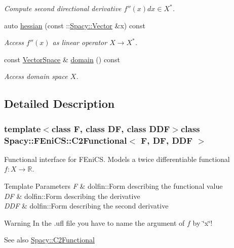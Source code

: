 \begin{DoxyCompactItemize}
\begin{DoxyCompactList}\small\item\em \-Compute second directional derivative $f''(x)dx\in X^* $. \end{DoxyCompactList}\item 
auto \hyperlink{classSpacy_1_1FEniCS_1_1C2Functional_aceec6783f701e121b35ffa482629e1dd}{hessian} (const \-::\hyperlink{classSpacy_1_1Vector}{\-Spacy\-::\-Vector} \&x) const 
\begin{DoxyCompactList}\small\item\em \-Access $f''(x)$ as linear operator $X\rightarrow X^*$. \end{DoxyCompactList}\item 
\hypertarget{classSpacy_1_1FunctionalBase_a2d3397deb9fa1ad85ed04e37a03b3aa6}{const \hyperlink{classSpacy_1_1VectorSpace}{\-Vector\-Space} \& \hyperlink{classSpacy_1_1FunctionalBase_a2d3397deb9fa1ad85ed04e37a03b3aa6}{domain} () const }\label{classSpacy_1_1FunctionalBase_a2d3397deb9fa1ad85ed04e37a03b3aa6}

\begin{DoxyCompactList}\small\item\em \-Access domain space $X$. \end{DoxyCompactList}\end{DoxyCompactItemize}


\subsection{\-Detailed \-Description}
\subsubsection*{template$<$class \-F, class \-D\-F, class \-D\-D\-F$>$class Spacy\-::\-F\-Eni\-C\-S\-::\-C2\-Functional$<$ F, D\-F, D\-D\-F $>$}

\-Functional interface for \-F\-Eni\-C\-S. \-Models a twice differentiable functional $f:X\rightarrow \mathbb{R}$. 


\begin{DoxyTemplParams}{\-Template Parameters}
{\em \-F} & dolfin\-::\-Form describing the functional value \\
\hline
{\em \-D\-F} & dolfin\-::\-Form describing the derivative \\
\hline
{\em \-D\-D\-F} & dolfin\-::\-Form describing the second derivative \\
\hline
\end{DoxyTemplParams}
\begin{DoxyWarning}{\-Warning}
\-In the .ufl file you have to name the argument of $f$ by \char`\"{}x\char`\"{}! 
\end{DoxyWarning}
\begin{DoxySeeAlso}{\-See also}
\hyperlink{classSpacy_1_1C2Functional}{\-Spacy\-::\-C2\-Functional} 
\end{DoxySeeAlso}


